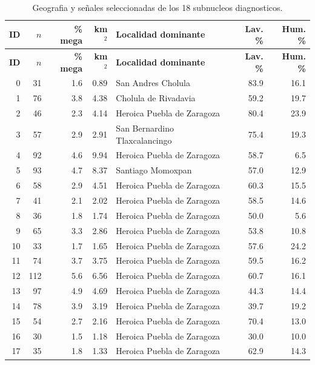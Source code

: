 \documentclass[11pt,letterpaper]{article}
\begin{document}
\begin{longtable}{rrrrlrr}
\caption{Geografia y señales seleccionadas de los 18 subnucleos diagnosticos.}\\
\toprule
\textbf{ID} & \textbf{$n$} & \textbf{\% mega} & \textbf{km$^2$} & \textbf{Localidad dominante} & \textbf{Lav. \%} & \textbf{Hum. \%} \\
\midrule
\endfirsthead
\toprule
\textbf{ID} & \textbf{$n$} & \textbf{\% mega} & \textbf{km$^2$} & \textbf{Localidad dominante} & \textbf{Lav. \%} & \textbf{Hum. \%} \\
\midrule
\endhead
0 & 31 & 1.6 & 0.89 & San Andres Cholula & 83.9 & 16.1 \\
1 & 76 & 3.8 & 4.38 & Cholula de Rivadavia & 59.2 & 19.7 \\
2 & 46 & 2.3 & 4.14 & Heroica Puebla de Zaragoza & 80.4 & 23.9 \\
3 & 57 & 2.9 & 2.91 & San Bernardino Tlaxcalancingo & 75.4 & 19.3 \\
4 & 92 & 4.6 & 9.94 & Heroica Puebla de Zaragoza & 58.7 & 6.5 \\
5 & 93 & 4.7 & 8.37 & Santiago Momoxpan & 57.0 & 12.9 \\
6 & 58 & 2.9 & 4.51 & Heroica Puebla de Zaragoza & 60.3 & 15.5 \\
7 & 41 & 2.1 & 2.02 & Heroica Puebla de Zaragoza & 58.5 & 14.6 \\
8 & 36 & 1.8 & 1.74 & Heroica Puebla de Zaragoza & 50.0 & 5.6 \\
9 & 65 & 3.3 & 2.86 & Heroica Puebla de Zaragoza & 53.8 & 10.8 \\
10 & 33 & 1.7 & 1.65 & Heroica Puebla de Zaragoza & 57.6 & 24.2 \\
11 & 74 & 3.7 & 3.75 & Heroica Puebla de Zaragoza & 59.5 & 16.2 \\
12 & 112 & 5.6 & 6.56 & Heroica Puebla de Zaragoza & 60.7 & 16.1 \\
13 & 97 & 4.9 & 4.69 & Heroica Puebla de Zaragoza & 44.3 & 14.4 \\
14 & 78 & 3.9 & 3.19 & Heroica Puebla de Zaragoza & 39.7 & 19.2 \\
15 & 54 & 2.7 & 2.16 & Heroica Puebla de Zaragoza & 70.4 & 13.0 \\
16 & 30 & 1.5 & 1.18 & Heroica Puebla de Zaragoza & 30.0 & 10.0 \\
17 & 35 & 1.8 & 1.33 & Heroica Puebla de Zaragoza & 62.9 & 14.3 \\
\bottomrule
\end{longtable}
\end{document}
